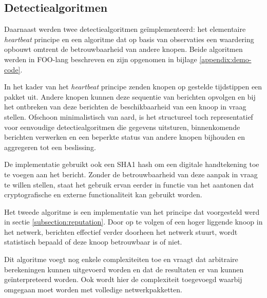 \subsection{Detectiealgoritmen}
\label{subsection:eval-algorithms}

Daarnaast werden twee detectiealgoritmen ge\"implementeerd: het elementaire
\emph{heartbeat} principe en een algoritme dat op basis van observaties een
waardering opbouwt omtrent de betrouwbaarheid van andere knopen. Beide
algoritmen werden in FOO-lang beschreven en zijn opgenomen in bijlage
\ref{appendix:demo-code}.

\begin{description}[noitemsep, topsep=0pt, partopsep=1pt]

  \item[Heartbeat] In het kader van het \emph{heartbeat} principe zenden
  knopen op gestelde tijdstippen een pakket uit. Andere knopen kunnen deze
  sequentie van berichten opvolgen en bij het ontbreken van deze berichten de
  beschikbaarheid van een knoop in vraag stellen. Ofschoon minimalistisch van
  aard, is het structureel toch representatief voor eenvoudige
  detectiealgoritmen die gegevens uitsturen, binnenkomende berichten verwerken
  en een beperkte status van andere knopen bijhouden en aggregeren tot een
  beslissing.

  De implementatie gebruikt ook een SHA1 hash \citep{rfc:3174} om een digitale
  handtekening toe te voegen aan het bericht. Zonder de betrouwbaarheid van
  deze aanpak in vraag te willen stellen, staat het gebruik ervan eerder in
  functie van het aantonen dat cryptografische en externe functionaliteit kan
  gebruikt worden.

  \item[Reputatie] Het tweede algoritme is een implementatie van het principe
  dat voorgesteld werd in sectie \ref{subsection:reputation}. Door op te volgen
  of een hoger liggende knoop in het netwerk, berichten effectief verder
  doorheen het netwerk stuurt, wordt statistisch bepaald of deze knoop
  betrouwbaar is of niet.

  Dit algoritme voegt nog enkele complexiteiten toe en vraagt dat arbitraire
  berekeningen kunnen uitgevoerd worden en dat de resultaten er van kunnen
  ge\"interpreteerd worden. Ook wordt hier de complexiteit toegevoegd waarbij
  omgegaan moet worden met volledige netwerkpakketten.

\end{description}

\vspace{-3mm}

